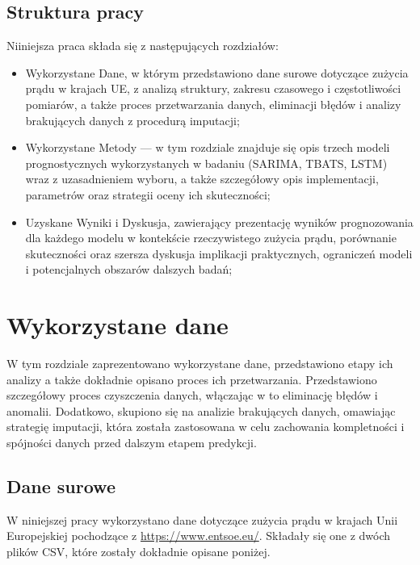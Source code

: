 \documentclass[polish, twoside, 12pt, a4paper]{article}
\theoremstyle{definition}
\theoremstyle{plain}
\theoremstyle{remark}
\begin{document}
\subsection{Struktura pracy}
Niiniejsza praca składa się z następujących rozdziałów:
\begin{itemize}[noitemsep]
    \item Wykorzystane Dane, w którym przedstawiono dane surowe dotyczące zużycia prądu w krajach UE, z analizą struktury, zakresu czasowego i częstotliwości pomiarów, a także proces przetwarzania danych, eliminacji błędów i analizy brakujących danych z procedurą imputacji;
    \item Wykorzystane Metody --- w tym rozdziale znajduje się opis trzech modeli prognostycznych wykorzystanych w badaniu (SARIMA, TBATS, LSTM) wraz z uzasadnieniem wyboru, a także szczegółowy opis implementacji, parametrów oraz strategii oceny ich skuteczności;
    \item Uzyskane Wyniki i Dyskusja, zawierający prezentację wyników prognozowania dla każdego modelu w kontekście rzeczywistego zużycia prądu, porównanie skuteczności oraz szersza dyskusja implikacji praktycznych, ograniczeń modeli i potencjalnych obszarów dalszych badań;
\end{itemize}

\clearpage
\section{Wykorzystane dane}\label{sec:dane}
W tym rozdziale zaprezentowano wykorzystane dane, przedstawiono etapy ich analizy a także dokładnie opisano proces ich przetwarzania. Przedstawiono szczegółowy proces czyszczenia danych, włączając w to eliminację błędów i anomalii. Dodatkowo, skupiono się na analizie brakujących danych, omawiając strategię imputacji, która została zastosowana w celu zachowania kompletności i spójności danych przed dalszym etapem predykcji.

\subsection{Dane surowe}

W niniejszej pracy wykorzystano dane dotyczące zużycia prądu w krajach Unii Europejskiej pochodzące z \url{https://www.entsoe.eu/}. Składały się one z dwóch plików CSV, które zostały dokładnie opisane poniżej. 
\end{document}
